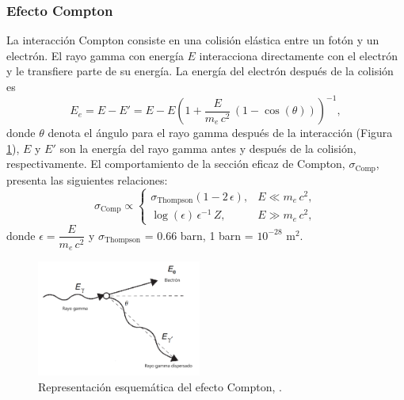 		\subsubsection{Efecto Compton}
La interacción Compton consiste en una colisión elástica entre un fotón y un electrón. El rayo gamma con energía $E$ interacciona directamente con el electrón y le transfiere parte de su energía. La energía del electrón después de la colisión es \cite{gilmore2008}
\begin{equation}\label{Eq-Energia-Gamma-Nueva}
E_e = E - E' = E - E \left( 1+\dfrac{E}{m_e\,c^2}\,(1-\cos(\theta)) \right)^{-1},
\end{equation}
donde $\theta$ denota el ángulo para el rayo gamma después de la interacción  (Figura \ref{Fig-Compton}), $E$ y $E'$ son la energía del rayo gamma antes y después de la colisión, respectivamente. El comportamiento de la sección eficaz de Compton, $\sigma_\text{Comp}$, presenta las siguientes relaciones: \cite{grupen2008particle}
\begin{equation}
\sigma_\text{Comp} \propto
  \begin{cases}
    \sigma_{\text{Thompson}}(1-2\,\epsilon),	& E \ll m_e\,c^2, \\
    \log(\epsilon)\, \epsilon^{-1} \,Z,		&  E \gg m_e\,c^2,
  \end{cases}
\end{equation}
donde $\epsilon = \dfrac{E}{m_e\,c^2}$ y $\sigma_{\text{Thompson}}$ = 0.66 barn, 1 barn = $10^{-28}$ m$^{2}$.
		\begin{figure}[h]
		\centering
		\includegraphics[width=0.48\textwidth]{Imagenes/Compton-2.png}
		\caption{Representación esquemática del efecto Compton, \cite{gilmore2008}.}\label{Fig-Compton}
		\end{figure}
